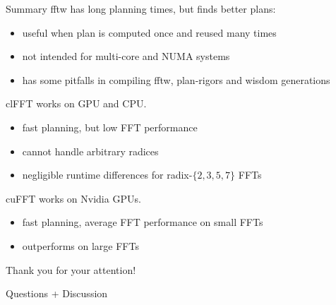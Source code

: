 \documentclass[t,11pt,hyperref={
  pdftitle = {gearshifft},
  pdfsubject = {gearshifft},
  pdfborder={0 0 0},
  colorlinks=true,
  urlcolor=red,
  citecolor=red,
  linkcolor=red,
  pdfauthor={Peter Steinbach, Matthias Werner}
  }
]{beamer}
\begin{document}
\begin{frame}{Summary}{}
  fftw has long planning times, but finds better plans:
  \begin{itemize}
  \item useful when plan is computed once and reused many times
  \item not intended for multi-core and NUMA systems
  \item has some pitfalls in compiling fftw, plan-rigors and wisdom generations
  \end{itemize}

  clFFT works on GPU and CPU.
  \begin{itemize}
  \item fast planning, but low FFT performance
  \item cannot handle arbitrary radices
  \item negligible runtime differences for radix-$\{2,3,5,7\}$ FFTs
  \end{itemize}

  cuFFT works on Nvidia GPUs.
  \begin{itemize}
  \item fast planning, average FFT performance on small FFTs
  \item outperforms on large FFTs
  \end{itemize}
  
\end{frame}

\appendix
{}

\begin{frame}{}{}
  \vfill
  
  \LARGE\centering
  
  Thank you for your attention!

  \large
  Questions + Discussion
  \vfill
\end{frame}
\end{document}

